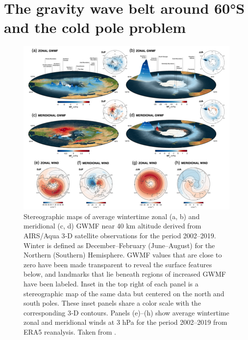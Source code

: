 \section{The gravity wave belt around 60°S and the cold pole problem}
\label{sec:waveBelt} %
%
\begin{figure}[ht]
    \centering
    \includegraphics[width=0.99\textwidth]{Figures/hindley_2020_GWMF.png}
    \caption{Stereographic maps of average wintertime zonal (a, b) and meridional (c, d) GWMF near 40 km altitude derived from AIRS/Aqua 3‐D satellite observations for the period 2002–2019. Winter is defined as December–February (June–August) for the Northern (Southern) Hemisphere. GWMF values that are close to zero have been made transparent to reveal the surface features below, and landmarks that lie beneath regions of increased GWMF have been labeled. Inset in the top right of each panel is a stereographic map of the same data but centered on the north and south poles. These inset panels share a color scale with the corresponding 3‐D contours. Panels (e)–(h) show average wintertime zonal and meridional winds at 3 hPa for the period 2002–2019 from ERA5 reanalysis. Taken from \cite{hindley_18year_2020}.}
    \label{fig:hindley_2020_GWMF}
\end{figure}
